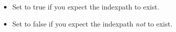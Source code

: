 \begin{itemize}
\item Set to true if you expect the indexpath to exist.
\item Set to false if you expect the indexpath \emph{not} to exist.
\end{itemize}
